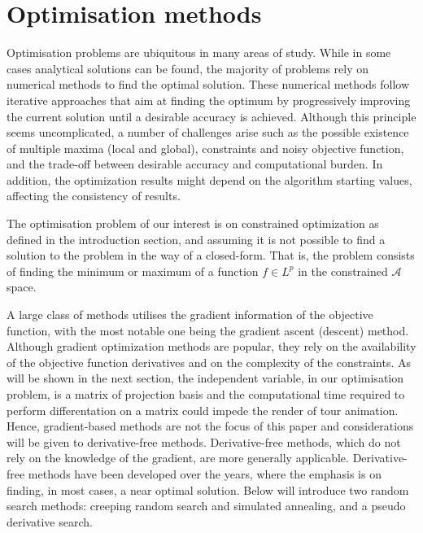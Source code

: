\hypertarget{optim}{%
\section{Optimisation methods}\label{optim}}

Optimisation problems are ubiquitous in many areas of study. While in
some cases analytical solutions can be found, the majority of problems
rely on numerical methods to find the optimal solution. These numerical
methods follow iterative approaches that aim at finding the optimum by
progressively improving the current solution until a desirable accuracy
is achieved. Although this principle seems uncomplicated, a number of
challenges arise such as the possible existence of multiple maxima
(local and global), constraints and noisy objective function, and the
trade-off between desirable accuracy and computational burden. In
addition, the optimization results might depend on the algorithm
starting values, affecting the consistency of results.

The optimisation problem of our interest is on constrained optimization
\citep{bertsekas2014constrained} as defined in the introduction section,
and assuming it is not possible to find a solution to the problem in the
way of a closed-form. That is, the problem consists of finding the
minimum or maximum of a function \(f \in L^p\) in the constrained
\(\mathcal{A}\) space.

A large class of methods utilises the gradient information of the
objective function, with the most notable one being the gradient ascent
(descent) method. Although gradient optimization methods are popular,
they rely on the availability of the objective function derivatives and
on the complexity of the constraints. As will be shown in the next
section, the independent variable, in our optimisation problem, is a
matrix of projection basis and the computational time required to
perform differentation on a matrix could impede the render of tour
animation. Hence, gradient-based methods are not the focus of this paper
and considerations will be given to derivative-free methods.
Derivative-free methods, which do not rely on the knowledge of the
gradient, are more generally applicable. Derivative-free methods have
been developed over the years, where the emphasis is on finding, in most
cases, a near optimal solution. Below will introduce two random search
methods: creeping random search and simulated annealing, and a pseudo
derivative search.

